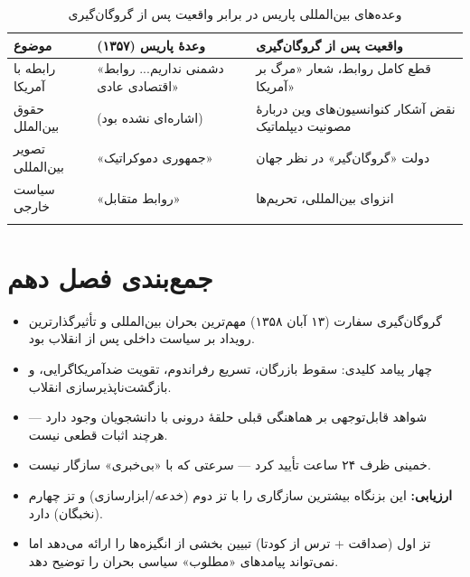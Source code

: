 \documentclass[12pt,a4paper]{book}
\newcommand{\keyword}[1]{\textbf{\textcolor{cPrimary}{#1}}}
\begin{document}
\begin{longtable}{%
    >{\raggedleft\arraybackslash}p{}
    >{\raggedleft\arraybackslash}p{}
    >{\raggedleft\arraybackslash}p{}}
\toprule
\rowcolor{cPrimary!10}
\textbf{موضوع} & \textbf{وعدهٔ پاریس (۱۳۵۷)} & \textbf{واقعیت پس از گروگان‌گیری} \\
\midrule
\endhead

رابطه با آمریکا &
«دشمنی نداریم... روابط اقتصادی عادی» &
قطع کامل روابط، شعار «مرگ بر آمریکا» \\
\midrule

حقوق بین‌الملل &
(اشاره‌ای نشده بود) &
نقض آشکار کنوانسیون‌های وین دربارهٔ مصونیت دیپلماتیک \\
\midrule

تصویر بین‌المللی &
«جمهوری دموکراتیک» &
دولت «گروگان‌گیر» در نظر جهان \\
\midrule

سیاست خارجی &
«روابط متقابل» &
انزوای بین‌المللی، تحریم‌ها \\

\bottomrule
\caption{وعده‌های بین‌المللی پاریس در برابر واقعیت پس از گروگان‌گیری}
\label{tab:promise-reality-intl}
\end{longtable}

\section{جمع‌بندی فصل دهم}

\begin{principleBox}
\begin{itemize}[label=\textcolor{cPrimary}{$\blacksquare$}, rightmargin=2em]
    \item گروگان‌گیری سفارت (۱۳ آبان ۱۳۵۸) مهم‌ترین بحران بین‌المللی و تأثیرگذارترین رویداد بر سیاست داخلی پس از انقلاب بود.
    \item چهار پیامد کلیدی: سقوط بازرگان، تسریع رفراندوم، تقویت ضدآمریکاگرایی، و بازگشت‌ناپذیرسازی انقلاب.
    \item شواهد قابل‌توجهی بر هماهنگی قبلی حلقهٔ درونی با دانشجویان وجود دارد — هرچند اثبات قطعی نیست.
    \item خمینی ظرف ۲۴ ساعت تأیید کرد — سرعتی که با «بی‌خبری» سازگار نیست.
    \item \keyword{ارزیابی:} این بزنگاه بیشترین سازگاری را با تز دوم (خدعه/ابزارسازی) و تز چهارم (نخبگان) دارد.
    \item تز اول (صداقت + ترس از کودتا) تبیین بخشی از انگیزه‌ها را ارائه می‌دهد اما نمی‌تواند پیامدهای «مطلوب» سیاسی بحران را توضیح دهد.
\end{itemize}
\end{principleBox}
\end{document}

